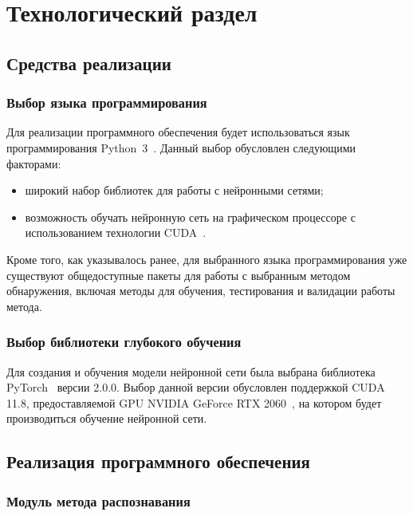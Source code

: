 \chapter{Технологический раздел}

\section{Средства реализации}

\subsection*{Выбор языка программирования}

Для реализации программного обеспечения будет использоваться язык программирования Python~3~\cite{python3}. Данный выбор обусловлен следующими факторами:
\begin{itemize}[label=---]
    \item широкий набор библиотек для работы с нейронными сетями;
    \item возможность обучать нейронную сеть на графическом процессоре с
использованием технологии CUDA~\cite{cuda}.
\end{itemize}

Кроме того, как указывалось ранее, для выбранного языка программирования уже существуют общедоступные пакеты для работы с выбранным методом обнаружения, включая методы для обучения, тестирования и валидации работы метода.

\subsection*{Выбор библиотеки глубокого обучения}

Для создания и обучения модели нейронной сети была выбрана библиотека PyTorch~\cite{pytorch} версии 2.0.0. Выбор данной версии обусловлен поддержкой CUDA 11.8, предоставляемой GPU NVIDIA GeForce RTX 2060~\cite{rtx2060}, на котором будет производиться обучение нейронной сети.

\section{Реализация программного обеспечения}

\subsection{Модуль метода распознавания}

